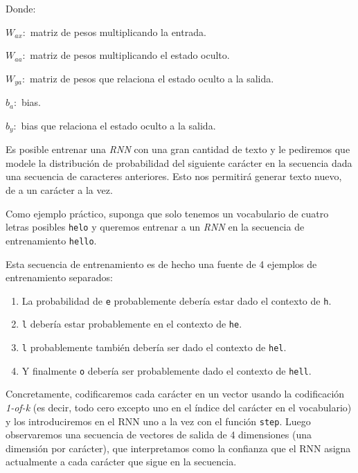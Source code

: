 \documentclass[a4paper,12pt]{article}
\begin{document}
Donde:

$ W_{ax}:$ matriz de pesos multiplicando la entrada.

$ W_{aa}:$ matriz de pesos multiplicando el estado oculto.

$ W_{ya}:$ matriz de pesos que relaciona el estado oculto a la salida.

$b_a:$ bias.

$b_y:$ bias que relaciona el estado oculto a la salida.

Es posible entrenar una \textit{RNN} con una gran cantidad de texto y le pediremos que modele la distribución de probabilidad del siguiente carácter en la secuencia dada una secuencia de caracteres anteriores. Esto nos permitirá generar texto nuevo, de a un carácter a la vez.

Como ejemplo práctico, suponga que solo tenemos un vocabulario de cuatro letras posibles \texttt{helo} y queremos entrenar a un \textit{RNN} en la secuencia de entrenamiento \texttt{hello}. 

\clearpage

Esta secuencia de entrenamiento es de hecho una fuente de 4 ejemplos de entrenamiento separados: 
\begin{enumerate}[noitemsep, topsep=2pt]
	\item La probabilidad de \texttt{e} probablemente debería estar dado el contexto de \texttt{h}.
	\item \texttt{l} debería estar probablemente en el contexto de \texttt{he}.
	\item \texttt{l} probablemente también debería ser dado el contexto de \texttt{hel}.
	\item  Y finalmente \texttt{o} debería ser probablemente dado el contexto de \texttt{hell}.
\end{enumerate}

Concretamente, codificaremos cada carácter en un vector usando la codificación \textit{1-of-k} (es decir, todo cero excepto uno en el índice del carácter en el vocabulario) y los introduciremos en el RNN uno a la vez con el función \texttt{step}. Luego observaremos una secuencia de vectores de salida de 4 dimensiones (una dimensión por carácter), que interpretamos como la confianza que el RNN asigna actualmente a cada carácter que sigue en la secuencia. 
\end{document}
